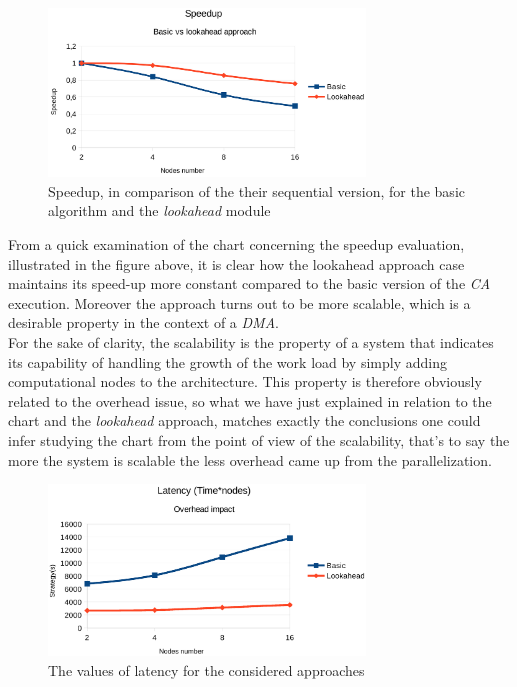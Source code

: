 \documentclass[12pt,a4paper,fleqn]{report}
\begin{document}
 \begin{figure}[ht!]
\label{chart2}
\centering
	\vspace{13pt}
    \includegraphics[trim=0mm 10mm 0mm 10mm, width=0.75\textwidth]{speedup_one}
    \caption{Speedup, in comparison of the their sequential version, for the basic algorithm and the \textit{lookahead} module}
\end{figure}

From a quick examination of the chart concerning the speedup evaluation, 
illustrated in the figure above, it is clear how 
the lookahead approach case maintains its speed-up more constant compared to the basic 
version of the \textit{CA} execution. Moreover the approach turns out to be more scalable, 
which is a desirable property in the context of a \textit{DMA}. \\

For the sake of clarity, the scalability is the property of a system that indicates its capability of 
handling the growth of the work load by simply adding computational nodes to the architecture. 
This property is therefore obviously related to the overhead issue, so what we have just 
explained in relation to the chart and the \textit{lookahead} approach, matches exactly the 
conclusions one could infer studying the chart from the point of view of the scalability, that's 
to say the more the system is scalable the less overhead came up from the parallelization.   \\

 \begin{figure}[ht!]
\label{chart3}
\centering
	\vspace{13pt}
    \includegraphics[trim=0mm 10mm 0mm 10mm, width=0.75\textwidth]{latency}
    \caption{The values of latency for the considered approaches}
\end{figure}
\end{document}
